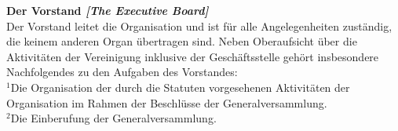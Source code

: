 \documentclass[10pt]{article}
\newcounter{qcounter}
\begin{document}
\begin{list}{{\bf Artikel :~}}{}
\item {\bf Der Vorstand {\it[The Executive Board]}}\label{EM}\\
Der Vorstand leitet die Organisation und ist f\"ur alle Angelegenheiten zust\"andig, die keinem anderen Organ \"ubertragen sind. Neben Oberaufsicht \"uber die Aktivit\"aten der Vereinigung inklusive der Gesch\"aftsstelle geh\"ort insbesondere Nachfolgendes zu den Aufgaben des Vorstandes:\\
$^{1}$Die Organisation der durch die Statuten vorgesehenen Aktivit\"aten der Organisation im Rahmen der Beschl\"usse der Generalversammlung.\\
$^{2}$Die Einberufung der Generalversammlung.


\end{list}
\end{document}
